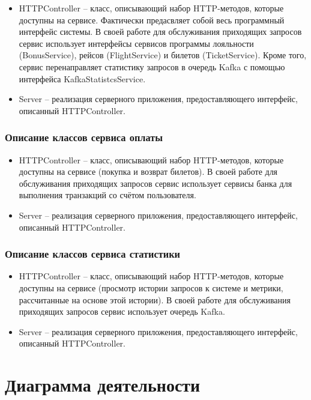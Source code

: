 \begin{itemize}
    \item HTTPController -- класс, описывающий набор  HTTP-методов, которые доступны на сервисе. Фактически предасвляет собой весь программный интерфейс системы. В своей работе для обслуживания приходящих запросов сервис использует интерфейсы сервисов программы лояльности (BonusService), рейсов (FlightService) и билетов (TicketService). Кроме того, сервис перенаправляет статистику запросов в очередь Kafka с помощью интерфейса KafkaStatistcsService.
    \item Server -- реализация серверного приложения, предоставляющего интерфейс, описанный HTTPController.
\end{itemize}

\subsubsection{Описание классов сервиса оплаты}

\begin{itemize}
    \item HTTPController -- класс, описывающий набор  HTTP-методов, которые доступны на сервисе (покупка и возврат билетов). В своей работе для обслуживания приходящих запросов сервис использует сервисы банка для выполнения транзакций со счётом пользователя.
    \item Server -- реализация серверного приложения, предоставляющего интерфейс, описанный HTTPController.
\end{itemize}

\subsubsection{Описание классов сервиса статистики}
\begin{itemize}
    \item HTTPController -- класс, описывающий набор  HTTP-методов, которые доступны на сервисе (просмотр истории запросов к системе и метрики, рассчитанные на основе этой истории). В своей работе для обслуживания приходящих запросов сервис использует очередь Kafka.
    \item Server -- реализация серверного приложения, предоставляющего интерфейс, описанный HTTPController.
\end{itemize}

\section{Диаграмма деятельности}

